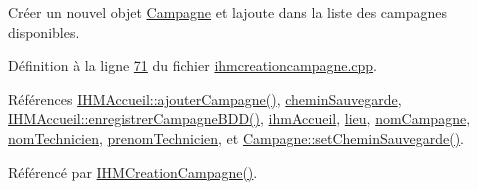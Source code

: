 Créer un nouvel objet \hyperlink{class_campagne}{Campagne} et l\textquotesingle{}ajoute dans la liste des campagnes disponibles. 



Définition à la ligne \hyperlink{ihmcreationcampagne_8cpp_source_l00071}{71} du fichier \hyperlink{ihmcreationcampagne_8cpp_source}{ihmcreationcampagne.\+cpp}.



Références \hyperlink{ihmaccueil_8cpp_source_l00254}{I\+H\+M\+Accueil\+::ajouter\+Campagne()}, \hyperlink{ihmcreationcampagne_8h_source_l00031}{chemin\+Sauvegarde}, \hyperlink{ihmaccueil_8cpp_source_l00273}{I\+H\+M\+Accueil\+::enregistrer\+Campagne\+B\+D\+D()}, \hyperlink{ihmcreationcampagne_8h_source_l00026}{ihm\+Accueil}, \hyperlink{ihmcreationcampagne_8h_source_l00030}{lieu}, \hyperlink{ihmcreationcampagne_8h_source_l00027}{nom\+Campagne}, \hyperlink{ihmcreationcampagne_8h_source_l00028}{nom\+Technicien}, \hyperlink{ihmcreationcampagne_8h_source_l00029}{prenom\+Technicien}, et \hyperlink{campagne_8cpp_source_l00060}{Campagne\+::set\+Chemin\+Sauvegarde()}.



Référencé par \hyperlink{ihmcreationcampagne_8cpp_source_l00011}{I\+H\+M\+Creation\+Campagne()}.



